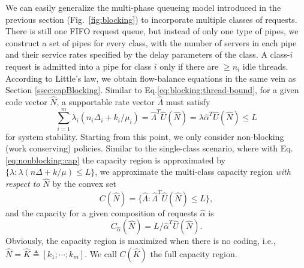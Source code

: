 \documentclass[journal]{IEEEtran}
\newcommand{\rateVec}{\hat{\Lambda}}
\newcommand{\codeVec}{\hat{N}}
\newcommand{\minCodeVec}{\hat{K}}
\newcommand{\usageVec}{\hat{U}}
\newcommand{\compVec}{\hat{\alpha}}
\begin{document}
We can easily generalize the multi-phase queueing model introduced in the previous section (Fig.~\ref{fig:blocking}) to incorporate multiple classes of requests. There is still one FIFO request queue, but instead of only one type of pipes, we construct a set of pipes for every class, with the number of servers in each pipe and their service rates specified by the delay parameters of the class. A class-$i$ request is admitted into a pipe for class $i$ only if there are  $\ge n_i$ idle threads. 
According to Little's law, we obtain flow-balance equations in the same vein as Section \ref{ssec:capBlocking}. Similar to Eq.\ref{eq:blocking:thread-bound}, for a given code vector $\codeVec$, a supportable rate vector $\rateVec$ must satisfy
\begin{equation*}
\sum_{i=1}^m \lambda_i(n_i \Delta_i + k_i/ \mu_i) 
= \rateVec^T \usageVec(\codeVec) 
= \lambda \compVec^T \usageVec(\codeVec) \le L
\label{eq:multiclass-rate-region}
\end{equation*}
for system stability. Starting from this point, we only consider  non-blocking (work conserving) policies. Similar to the single-class scenario, where with Eq.\ref{eq:nonblocking:cap} the capacity region is approximated by $\{\lambda:\lambda(n\Delta + k/\mu) \le L\}$, we approximate the multi-class capacity region {\em with respect to $\codeVec$} by the convex set
\begin{equation*}
C(\codeVec) = \{\rateVec: \rateVec^T\usageVec(\codeVec) \le L\},
\label{eq:multiclass-capacity}
\end{equation*}
and the capacity for a given composition of requests $\compVec$ is
\begin{equation*}
C_{\compVec}(\codeVec) = L/\compVec^T \usageVec(\codeVec).
\end{equation*}
Obviously, the capacity region is maximized when there is no coding, i.e., $\codeVec = \minCodeVec\triangleq [k_1;\cdots;k_m]$. We call $C(\minCodeVec)$ the full capacity region.  
\end{document}
